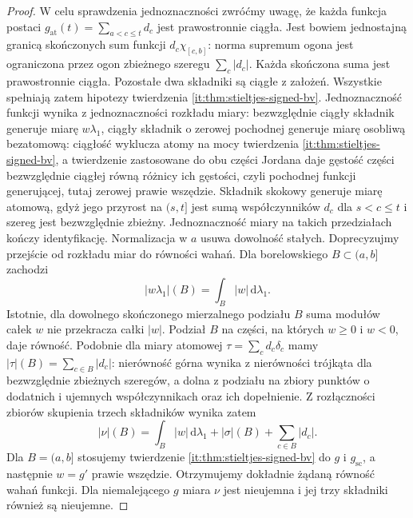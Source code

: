 \begin{proof}
W celu sprawdzenia jednoznaczności zwróćmy uwagę,
że każda funkcja postaci
$g_{\mathrm{at}}(t)=\sum_{a<c\le t}d_c$ jest prawostronnie
ciągła. Jest bowiem jednostajną granicą skończonych sum
funkcji $d_c\chi_{[c,b]}$: norma supremum ogona jest
ograniczona przez ogon zbieżnego szeregu $\sum_c|d_c|$.
Każda skończona suma jest prawostronnie ciągła.
Pozostałe dwa składniki są ciągłe z założeń.
Wszystkie spełniają zatem hipotezy twierdzenia
\ref{it:thm:stieltjes-signed-bv}.
Jednoznaczność funkcji wynika z jednoznaczności rozkładu
miary: bezwzględnie ciągły składnik generuje miarę
$w\lambda_1$, ciągły składnik o zerowej pochodnej
generuje miarę osobliwą bezatomową: ciągłość wyklucza
atomy na mocy twierdzenia \ref{it:thm:stieltjes-signed-bv},
a twierdzenie  zastosowane
do obu części Jordana daje gęstość części bezwzględnie
ciągłej równą różnicy ich gęstości, czyli pochodnej
funkcji generującej, tutaj zerowej prawie wszędzie.
Składnik skokowy generuje miarę atomową, gdyż jego
przyrost na $(s,t]$ jest sumą współczynników
$d_c$ dla $s<c\le t$ i szereg jest bezwzględnie zbieżny.
Jednoznaczność miary na takich przedziałach kończy
identyfikację.
Normalizacja w $a$ usuwa dowolność stałych.
Doprecyzujmy przejście od rozkładu miar do równości
wahań. Dla borelowskiego $B\subset(a,b]$ zachodzi
\[
 |w\lambda_1|(B)=\int_B|w|\,\mathrm d\lambda_1.
\]
Istotnie, dla dowolnego skończonego mierzalnego podziału
$B$ suma modułów całek $w$ nie przekracza całki $|w|$.
Podział $B$ na części, na których $w\ge0$ i $w<0$,
daje równość. Podobnie dla miary atomowej
$\tau=\sum_c d_c\delta_c$ mamy
$|\tau|(B)=\sum_{c\in B}|d_c|$: nierówność górna wynika
z nierówności trójkąta dla bezwzględnie zbieżnych
szeregów, a dolna z podziału na zbiory punktów
o dodatnich i ujemnych współczynnikach oraz ich
dopełnienie. Z rozłączności zbiorów skupienia
trzech składników wynika zatem
\[
 |\nu|(B)=\int_B|w|\,\mathrm d\lambda_1
           +|\sigma|(B)+\sum_{c\in B}|d_c|.
\]
Dla $B=(a,b]$ stosujemy twierdzenie
\ref{it:thm:stieltjes-signed-bv} do $g$ i $g_{\mathrm{sc}}$,
a następnie $w=g'$ prawie wszędzie. Otrzymujemy
dokładnie żądaną równość wahań funkcji. Dla niemalejącego $g$ miara $\nu$ jest
nieujemna i jej trzy składniki również są nieujemne.
\end{proof}

